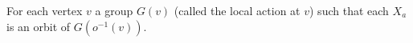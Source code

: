 \documentclass[preview]{standalone}
\begin{document}
For each vertex $v$ a group $G(v)$ (called the local action at $v$) such that each $X_a$ is an orbit of $G(o^{-1}(v))$.\\
\end{document}
